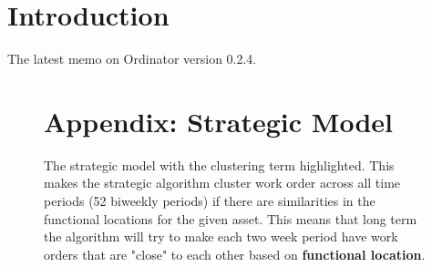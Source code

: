 \documentclass[11pt]{article}
\begin{document}
	
	\section{Introduction}
	The latest memo on Ordinator version 0.2.4.
	

	\newpage
	\begin{figure}
		\section{Appendix: Strategic Model}\label{sec:strategic-model}
		\strategicModel[clustering=true, beta=false, multiskill=true]
		\caption{The strategic model with the clustering term highlighted. This makes the
			strategic algorithm cluster work order across all time periods (52 biweekly periods)
			if there are similarities in the functional locations for the given asset. This means
			that long term the algorithm will try to make each two week period have work orders
			that are "close" to each other based on \textbf{functional location}.
		}
	\end{figure}
	\newpage

	
	
\end{document}
